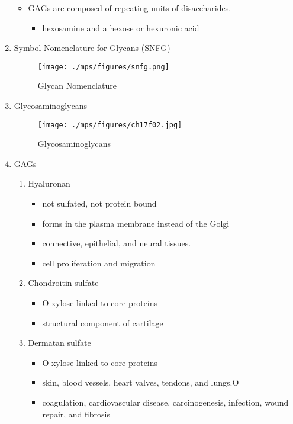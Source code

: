 \documentclass{scrartcl}
\begin{document}
\begin{enumerate}
\begin{itemize}
\item GAGs are composed of repeating units of disaccharides.
\begin{itemize}
\item hexosamine and a hexose or hexuronic acid
\end{itemize}
\end{itemize}

\item Symbol Nomenclature for Glycans (SNFG)
\label{sec:org452a498}

\begin{figure}[htbp]
\centering
\texttt{[image: ./mps/figures/snfg.png]}
\caption[Glycan Nomenclature]{\label{fig:org08d25ae}
Glycan Nomenclature}
\end{figure}


\item Glycosaminoglycans
\label{sec:org35efb63}

\begin{figure}[htbp]
\centering
\texttt{[image: ./mps/figures/ch17f02.jpg]}
\caption[Glycosaminoglycans]{\label{fig:org038d15b}
Glycosaminoglycans}
\end{figure}

\item GAGs
\label{sec:orgca138df}

\begin{enumerate}
\item Hyaluronan
\label{sec:orgd886437}
\begin{itemize}
\item not sulfated, not protein bound
\item forms in the plasma membrane instead of the Golgi
\item connective, epithelial, and neural tissues.
\item cell proliferation and migration
\end{itemize}

\item Chondroitin sulfate
\label{sec:org7c93c2a}
\begin{itemize}
\item O-xylose-linked to core proteins
\item structural component of cartilage
\end{itemize}

\item Dermatan sulfate
\label{sec:org1ecdaa3}
\begin{itemize}
\item O-xylose-linked to core proteins
\item skin, blood vessels, heart valves, tendons, and lungs.O
\item coagulation, cardiovascular disease, carcinogenesis, infection, wound repair, and fibrosis
\end{itemize}
\end{enumerate}


\end{enumerate}
\end{document}
